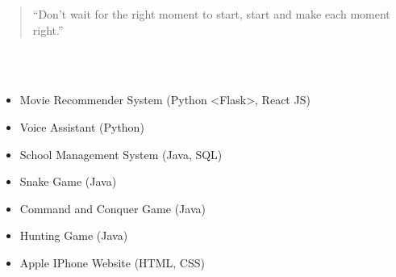 \documentclass[10pt,a4paper,ragged2e,withhyper]{altacv}
\begin{document}
\begin{paracol}{2}






\switchcolumn


\begin{quote}
``Don't wait for the right moment to start, start and make each moment right.''
\end{quote}





\divider\smallskip



\\
\\

\divider\smallskip



\divider\smallskip


\begin{itemize}
\item Movie Recommender System (Python <Flask>, React JS)
\item Voice Assistant (Python)
\item School Management System (Java, SQL)
\item Snake Game (Java)
\item Command and Conquer Game (Java)
\item Hunting Game (Java)
\item Apple IPhone Website (HTML, CSS)
\end{itemize}



\end{paracol}
\end{document}
